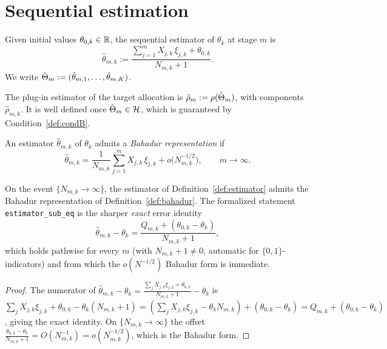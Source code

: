 \section{Sequential estimation}
\label{sec:model_estimation}

\begin{definition}\label{def:estimator}
\leanok
{}
Given initial values $\theta_{0,k} \in \mathbb{R}$, the sequential estimator of
$\theta_k$ at stage $m$ is
\[
  \hat{\theta}_{m,k} := \frac{\sum_{j=1}^m X_{j,k}\, \xi_{j,k} + \theta_{0,k}}{N_{m,k} + 1}.
\]
We write $\hat{\Theta}_m := (\hat{\theta}_{m,1}, \dots, \hat{\theta}_{m,K})$.
\end{definition}

\begin{definition}\label{def:plugin_target}
\leanok
{}
The plug-in estimator of the target allocation is
$\hat{\rho}_m := \rho(\hat{\Theta}_m)$, with components $\hat{\rho}_{m,k}$.
It is well defined once $\hat{\Theta}_m \in \mathcal{H}$, which is guaranteed by
Condition~\ref{def:condB}.
\end{definition}

\begin{definition}\label{def:bahadur}
An estimator $\hat{\theta}_{m,k}$ of $\theta_k$ admits a \emph{Bahadur
representation} if
\[
  \hat{\theta}_{m,k} = \frac{1}{N_{m,k}}\sum_{j=1}^m X_{j,k}\, \xi_{j,k}
    + o\!\big(N_{m,k}^{-1/2}\big), \qquad m \to \infty.
\]
\end{definition}

\begin{lemma}\label{lem:estimator_bahadur}
\leanok
{}
On the event $\{N_{m,k} \to \infty\}$, the estimator of
Definition~\ref{def:estimator} admits the Bahadur representation of
Definition~\ref{def:bahadur}. The formalized statement \texttt{estimator\_sub\_eq} is the sharper
\emph{exact} error identity
\[
  \hat{\theta}_{m,k} - \theta_k = \frac{Q_{m,k} + (\theta_{0,k} - \theta_k)}{N_{m,k} + 1},
\]
which holds pathwise for every $m$ (with $N_{m,k}+1 \ne 0$, automatic for $\{0,1\}$-indicators) and
from which the $o(N^{-1/2})$ Bahadur form is immediate.
\end{lemma}

\begin{proof}\leanok
The numerator of $\hat{\theta}_{m,k} - \theta_k = \frac{\sum_j X_{j,k}\xi_{j,k} + \theta_{0,k}}{N_{m,k}
+ 1} - \theta_k$ is $\sum_j X_{j,k}\xi_{j,k} + \theta_{0,k} - \theta_k(N_{m,k}+1) = (\sum_j
X_{j,k}\xi_{j,k} - \theta_k N_{m,k}) + (\theta_{0,k} - \theta_k) = Q_{m,k} + (\theta_{0,k} -
\theta_k)$, giving the exact identity. On $\{N_{m,k}\to\infty\}$ the offset
$\frac{\theta_{0,k}-\theta_k}{N_{m,k}+1} = O(N_{m,k}^{-1}) = o(N_{m,k}^{-1/2})$, which is the Bahadur
form.
\end{proof}

